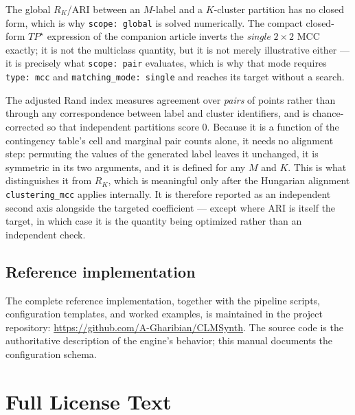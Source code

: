 \documentclass[a4paper,12pt]{article}
\begin{document}
\vspace{0.3em}
\noindent The global $R_K$/ARI between an $M$-label and a $K$-cluster partition has no closed form, which is why \texttt{scope: global} is solved numerically. The compact closed-form $TP^\star$ expression of the companion article inverts the \emph{single} $2\times2$ MCC exactly; it is not the multiclass quantity, but it is not merely illustrative either --- it is precisely what \texttt{scope: pair} evaluates, which is why that mode requires \texttt{type: mcc} and \texttt{matching\_mode: single} and reaches its target without a search.

\vspace{0.3em}
\noindent The adjusted Rand index measures agreement over \emph{pairs} of points rather than through any correspondence between label and cluster identifiers, and is chance-corrected so that independent partitions score $0$. Because it is a function of the contingency table's cell and marginal pair counts alone, it needs no alignment step: permuting the values of the generated label leaves it unchanged, it is symmetric in its two arguments, and it is defined for any $M$ and $K$. This is what distinguishes it from $R_K$, which is meaningful only after the Hungarian alignment \texttt{clustering\_mcc} applies internally. It is therefore reported as an independent second axis alongside the targeted coefficient --- except where ARI is itself the target, in which case it is the quantity being optimized rather than an independent check.

\subsection*{Reference implementation}
The complete reference implementation, together with the pipeline scripts, configuration templates, and worked examples, is maintained in the project repository: \url{https://github.com/A-Gharibian/CLMSynth}. The source code is the authoritative description of the engine's behavior; this manual documents the configuration schema.

\newpage

\begin{versionhistory}
\end{versionhistory}

\section*{Full License Text}
\end{document}
